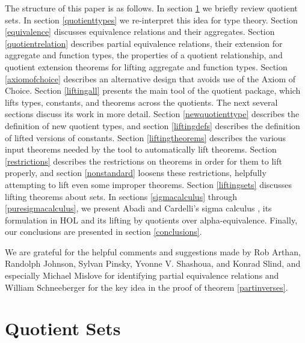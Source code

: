 \documentclass[envcountsame,runningheads]{llncs}
\newcommand{\quotient}{partial equivalence}
\begin{document}
The structure of this paper is as follows.  In section \ref{quotientsets}
we briefly review quotient sets.  In section \ref{quotienttypes} we
re-interpret this idea for type theory. 
Section \ref{equivalence} discusses equivalence relations and their
aggregates.
Section \ref{quotientrelation} describes \quotient{} relations,
their extension for aggregate and function types,
the properties of a quotient relationship,
and quotient extension theorems
for lifting aggregate and function types.
Section \ref{axiomofchoice} describes an alternative design
that avoids use of the Axiom of Choice.
Section \ref{liftingall} presents
the main tool of the quotient package, which lifts types, constants,
and theorems across the quotients.
The next several sections discuss
its work
in more detail.
Section \ref{newquotienttype}
describes the definition of new quotient types, and 
section \ref{liftingdefs} describes the definition of lifted versions
of constants.
Section \ref{liftingtheorems} describes the various input theorems needed by
the tool to automatically lift theorems.
Section \ref{restrictions} describes the restrictions on theorems
in order for them to lift properly, and section 
\ref{nonstandard} loosens these restrictions,
helpfully attempting to lift even some improper theorems.
Section \ref{liftingsets} discusses lifting theorems about sets.
In sections \ref{sigmacalculus} through 
\ref{puresigmacalculus}, we present Abadi and Cardelli's sigma calculus
\cite{AbCa96},
its formulation in HOL and its lifting by quotients over alpha-equivalence.
Finally, our conclusions are presented in section \ref{conclusions}.

We are grateful for the helpful comments and
suggestions made by
Rob Arthan,
Randolph Johnson,
Sylvan Pinsky,
Yvonne V. Shashoua,
and
Konrad Slind,
and especially Michael Mislove for identifying
partial equivalence relations and
William Schneeberger for the key idea in the proof of theorem
\ref{partinverses}.


%
\section{Quotient Sets}
%
\label{quotientsets}
\end{document}
